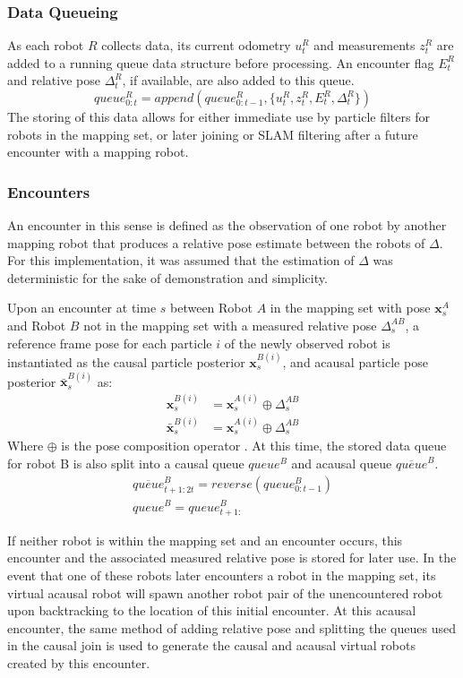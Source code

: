 \subsubsection{Data Queueing}
As each robot $R$ collects data, its current odometry $u_t^R$ and measurements $z_t^R$ are added to a running queue data structure before processing. An encounter flag $E_t^R$ and relative pose $\Delta_t^R$, if available, are also added to this queue. 
$$queue_{0:t}^R = append(queue_{0:t-1}^R, \{ u_t^R, z_t^R, E_t^R, \Delta_t^R \})$$
The storing of this data allows for either immediate use by particle filters for robots in the mapping set, or later joining or SLAM filtering after a future encounter with a mapping robot.
\vspace{0.1in}


\subsubsection{Encounters}
An encounter in this sense is defined as the observation of one robot by another mapping robot that produces a relative pose estimate between the robots of $\Delta$. For this implementation, it was assumed that the estimation of $\Delta$ was deterministic for the sake of demonstration and simplicity.

Upon an encounter at time $s$ between Robot $A$ in the mapping set with pose $\textbf{x}_s^A$ and Robot $B$ not in the mapping set with a measured relative pose $\Delta_s^{AB}$, a reference frame pose for each particle $i$ of the newly observed robot is instantiated as the causal particle posterior $\textbf{x}_s^{B(i)}$, and acausal particle pose posterior $\bar{\textbf{x}}_s^{B(i)}$ as:
\begin{eqnarray}
\textbf{x}_s^{B(i)} &= \textbf{x}_s^{A(i)} \oplus \Delta_s^{AB} \\
\bar{\textbf{x}}_s^{B(i)} &= \textbf{x}_s^{A(i)} \oplus \Delta_s^{AB}
\label{eq:relpose}
\end{eqnarray}
Where $\oplus$ is the pose composition operator \cite{smithSelfCheeseman1990}.
At this time, the stored data queue for robot B is also split into a causal queue $queue^B$ and acausal queue $\overline{queue}^B$.
\begin{align*}
\overline{queue}_{t+1:2t}^B = reverse(queue_{0:t-1}^B) \\
queue^B = queue_{t+1:}^B
\end{align*}

If neither robot is within the mapping set and an encounter occurs, this encounter and the associated measured relative pose is stored for later use. In the event that one of these robots later encounters a robot in the mapping set, its virtual acausal robot will spawn another robot pair of the unencountered robot upon backtracking to the location of this initial encounter. At this acausal encounter, the same method of adding relative pose and splitting the queues used in the causal join is used to generate the causal and acausal virtual robots created by this encounter.

